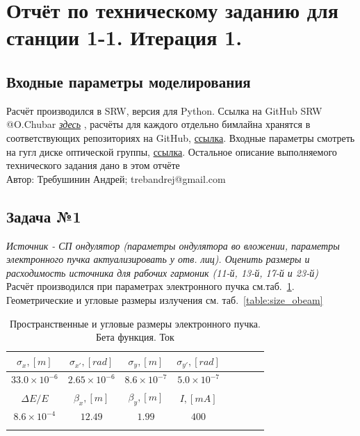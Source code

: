 \documentclass[14pt,a4paper]{extarticle}
\numberwithin{equation}{section}
\begin{document}
	
	\section{Отчёт по техническому заданию для станции 1-1. Итерация 1.}
	\subsection{Входные параметры моделирования}
	Расчёт производился в SRW, версия для Python. Ссылка на GitHub SRW @O.Chubar \textit{\href{https://github.com/ochubar/SRW.git}{здесь}} , расчёты для каждого отдельно бимлайна хранятся в соответствующих репозиториях на GitHub, {\href{https://github.com/TrebAndrew/thesis_andrei.git}{ссылка}}. Входные параметры смотреть на гугл диске оптической группы, {\href{https://drive.google.com/open?id=1zY-qElVNPh--SjBYmQvyMo7WluX_Am-s}{ссылка}}. Остальное описание выполняемого технического задания дано в этом отчёте\\
	Автор: Требушинин Андрей; trebandrej@gmail.com
	\subsection{Задача №1}
	\textit{Источник - СП ондулятор (параметры ондулятора во вложении, параметры электронного пучка актуализировать у отв. лиц). Оценить размеры и расходимость источника для рабочих гармоник (11-й, 13-й, 17-й и 23-й)}\\
	Расчёт производился при параметрах электронного пучка см.таб.~\ref{table:ebeam}. Геометрические и угловые размеры излучения см. таб.~\ref{table:size_obeam}\\
	\begin{table}[h!]
		\centering
		\begin{tabular}{cccccccc}
			\hline
			\toprule
			\rule{0pt}{3ex}   $\sigma_x, [m]$ & $\sigma_{x'}, [rad]$ & $\sigma_y, [m]$     & $\sigma_{y'}, [rad]$ \\ \hline
			\rule{0pt}{3ex}   $33.0 \times 10^{-6}$  & $2.65 \times 10^{-6}$  &  $8.6 \times 10^{-7}$ & $5.0 \times 10^{-7}$   \\
			\hline	\hline
			\rule{0pt}{3ex}   $\Delta E / E$ & $\beta_x,[m]$ & $\beta_y,[m]$   & $I,[mA]$\\ \hline
			\rule{0pt}{3ex}	 $8.6 \times 10^{-4}$ & $12.49$ & $1.99$ & $400$ \\ \hline
			\toprule
			\rule{0pt}{4ex}
		\end{tabular}
		\caption{Пространственные и угловые размеры электронного пучка. Бета функция. Ток}
		\label{table:ebeam}
	\end{table}
	
\end{document}
